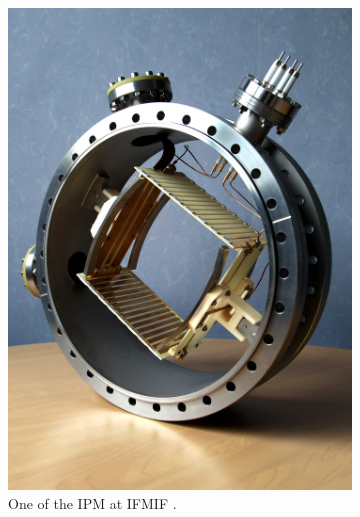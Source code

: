 \begin{figure}[!ht]
  \centering
  \begin{subfigure}[t]{0.45\textwidth}
    \includegraphics[width=\textwidth]{02_BeamDiag/figures/fig000_IPM_1}
    \caption[One of the IPM at IFMIF]{One of the IPM at IFMIF \cite{egberts2012}.}
    \label{}
  \end{subfigure}
  ~
  \begin{subfigure}[t]{0.45\textwidth}

\end{subfigure}
\end{figure}
